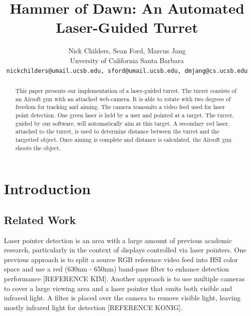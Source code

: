 \documentclass[10pt,twocolumn,letterpaper]{article}
\begin{document}
\title{Hammer of Dawn: An Automated Laser-Guided Turret}

\author{Nick Childers, Sean Ford, Marcus Jang\\
Unversity of California Santa Barbara\\
{\tt\small nickchilders@umail.ucsb.edu, sford@umail.ucsb.edu, dmjang@cs.ucsb.edu}
}

\maketitle
\thispagestyle{empty}

\begin{abstract}
This paper presents our implementation of a laser-guided turret. The turret consists of an Airsoft gun with an attached web-camera.  It is able to rotate with two degrees of freedom for tracking and aiming.  The camera transmits a video feed used for laser point detection.  One green laser is held by a user and pointed at a target.  The turret, guided by our software, will automatically aim at this target.  A secondary red laser, attached to the turret, is used to determine distance between the turret and the targetted object.  Once aiming is complete and distance is calculated, the Airsoft gun shoots the object.
\end{abstract}

\section{Introduction}

\subsection{Related Work}

Laser pointer detection is an area with a large amount of previous academic research, particularly in the context of displays controlled via laser pointers.  One previous approach is to split a source RGB reference video feed into HSI color space and use a red (630nm - 650nm) band-pass filter to enhance detection performance [REFERENCE KIM].  Another approach is to use multiple cameras to cover a large viewing area and a laser pointer that emits both visible and infrared light.  A filter is placed over the camera to remove visible light, leaving mostly infrared light for detection [REFERENCE KONIG].
\end{document}
